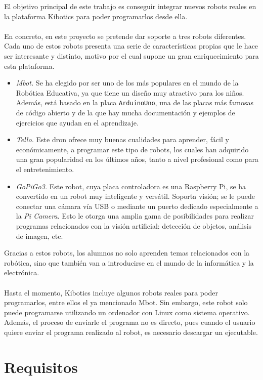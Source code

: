 \documentclass{report}
\begin{document}
El objetivo principal de este trabajo es conseguir integrar nuevos robots reales en la plataforma Kibotics para poder programarlos desde ella.
\\
\\
En concreto, en este proyecto se pretende dar soporte a tres robots diferentes. Cada uno de estos robots presenta una serie de características propias que le hace ser interesante y distinto, motivo por el cual supone un gran enriquecimiento para esta plataforma.
\begin{itemize}
	\item \textit{Mbot.} Se ha elegido por ser uno de los más populares en el mundo de la Robótica Educativa, ya que tiene un diseño muy atractivo para los niños. Además, está basado en la placa \texttt{ArduinoUno}, una de las placas más famosas de código abierto y de la que hay mucha documentación y ejemplos de ejercicios que ayudan en el aprendizaje.
	\item \textit{Tello.} Este dron ofrece muy buenas cualidades para aprender, fácil y económicamente, a programar este tipo de robots, los cuales han adquirido una gran popularidad en los últimos años, tanto a nivel profesional como para el entretenimiento.
	\item \textit{GoPiGo3.} Este robot, cuya placa controladora es una Raspberry Pi, se ha convertido en un robot muy inteligente y versátil. Soporta visión; se le puede conectar una cámara vía USB o mediante un puerto dedicado especialmente a la \textit{Pi Camera}. Esto le otorga una amplia gama de posibilidades para realizar programas relacionados con la visión artificial: detección de objetos, análisis de imagen, etc.
\end{itemize}
Gracias a estos robots, los alumnos no solo aprenden temas relacionados con la robótica, sino que también van a introducirse en el mundo de la informática y la electrónica.
\\
\\
Hasta el momento, Kibotics incluye algunos robots reales para poder programarlos, entre ellos el ya mencionado Mbot. Sin embargo, este robot solo puede programarse utilizando un ordenador con Linux como sistema operativo. Además, el proceso de enviarle el programa no es directo, pues cuando el usuario quiere enviar el programa realizado al robot, es necesario descargar un ejecutable.

\section{Requisitos}
\end{document}
